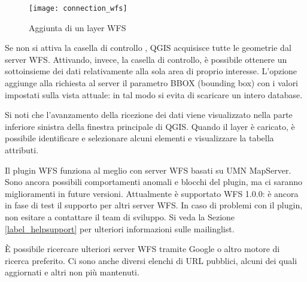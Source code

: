 \begin{figure}[ht]
  \begin{center}
  	\caption{Aggiunta di un layer WFS \nixcaption}\label{fig:wfs_dmsolutions}
	\texttt{[image: connection\_wfs]}
  \end{center}
\end{figure}

Se non si attiva la casella di controllo , QGIS acquisisce tutte le
geometrie dal server WFS. Attivando, invece, la casella di controllo, è possibile 
ottenere un sottoinsieme dei dati relativamente alla sola area di proprio interesse.
L'opzione aggiunge alla richiesta al server il parametro BBOX (bounding box) con i valori impostati 
sulla vista attuale: in tal modo si evita di scaricare un intero database. 

Si noti che l'avanzamento della ricezione dei dati viene visualizzato nella
parte inferiore sinistra della finestra principale di QGIS. 
Quando il layer è caricato, è possibile identificare e selezionare alcuni
elementi e visualizzare la tabella attributi.

Il plugin WFS funziona al meglio con server WFS basati su UMN
MapServer. Sono ancora possibili comportamenti anomali e blocchi del plugin,
ma ci saranno miglioramenti in future versioni. Attualmente è supportato WFS
1.0.0: è ancora in fase di test il supporto per altri server WFS. In caso 
di problemi con il plugin, non esitare a contattare il team di sviluppo.
Si veda la Sezione \ref{label_helpsupport} per ulteriori informazioni sulle mailinglist.

\begin{Tip}[ht]\caption{\textsc{Cercare server WFS}}
È possibile ricercare ulteriori server WFS tramite Google o altro
motore di ricerca preferito. Ci sono anche diversi elenchi di URL pubblici,
alcuni dei quali aggiornati e altri non più mantenuti.
\end{Tip} 

\FloatBarrier
